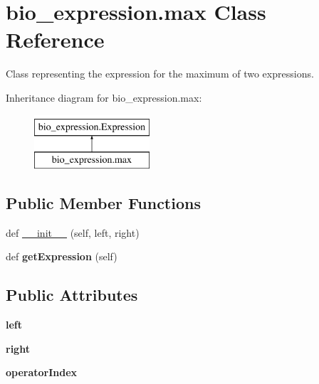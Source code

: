 \hypertarget{classbio__expression_1_1max}{}\section{bio\+\_\+expression.\+max Class Reference}
\label{classbio__expression_1_1max}


Class representing the expression for the maximum of two expressions.  


Inheritance diagram for bio\+\_\+expression.\+max\+:\begin{figure}[H]
\begin{center}
\leavevmode
\includegraphics[height=2.000000cm]{classbio__expression_1_1max}
\end{center}
\end{figure}
\subsection*{Public Member Functions}
\begin{DoxyCompactItemize}
\item 
def \hyperlink{classbio__expression_1_1max_af3f894d824f74ee5950b41c4d2aa572f}{\+\_\+\+\_\+init\+\_\+\+\_\+} (self, left, right)
\item 
def {\bfseries get\+Expression} (self)\hypertarget{classbio__expression_1_1max_aecb5ef10a442680a22a37b3f663eae9c}{}\label{classbio__expression_1_1max_aecb5ef10a442680a22a37b3f663eae9c}

\end{DoxyCompactItemize}
\subsection*{Public Attributes}
\begin{DoxyCompactItemize}
\item 
{\bfseries left}\hypertarget{classbio__expression_1_1max_a698892d9ef10ee244e421ebb437b82d3}{}\label{classbio__expression_1_1max_a698892d9ef10ee244e421ebb437b82d3}

\item 
{\bfseries right}\hypertarget{classbio__expression_1_1max_afc52928c47bc1e28c66dab84a03f7be3}{}\label{classbio__expression_1_1max_afc52928c47bc1e28c66dab84a03f7be3}

\item 
{\bfseries operator\+Index}\hypertarget{classbio__expression_1_1max_af109235d76eb1e03329a9b272d72d669}{}\label{classbio__expression_1_1max_af109235d76eb1e03329a9b272d72d669}

\end{DoxyCompactItemize}



